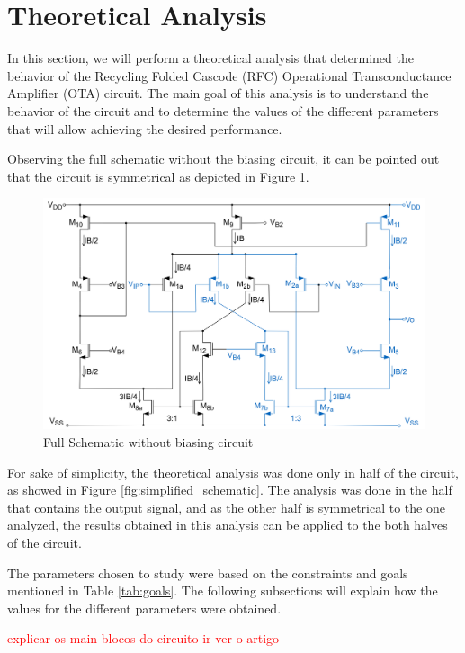 \section{Theoretical Analysis}
\label{sec:TheoreticalAnalysys}
In this section, we will perform a theoretical analysis that determined the behavior of the Recycling Folded Cascode (RFC) Operational Transconductance Amplifier (OTA) circuit. The main goal of this analysis is to understand the behavior of the circuit and to determine the values of the different parameters that will allow achieving the desired performance.

Observing the full schematic without the biasing circuit, it can be pointed out that the circuit is symmetrical as depicted in Figure \ref{fig:full_schematic}. 

\begin{figure}[H]
    \centering
    \includegraphics[width=1\textwidth]{Images/full_sch.png}
    \caption{Full Schematic without biasing circuit}
    \label{fig:full_schematic}
\end{figure}

For sake of simplicity, the theoretical analysis was done only in half of the circuit, as showed in Figure \ref{fig:simplified_schematic}. The analysis was done in the half that contains the output signal, and as the other half is symmetrical to the one analyzed, the results obtained in this analysis can be applied to the both halves of the circuit. 

The parameters chosen to study were based on the constraints and goals mentioned in Table \ref{tab:goals}. The following subsections will explain how the values for the different parameters were obtained.

\textcolor{red}{explicar os main blocos do circuito ir ver o artigo}

